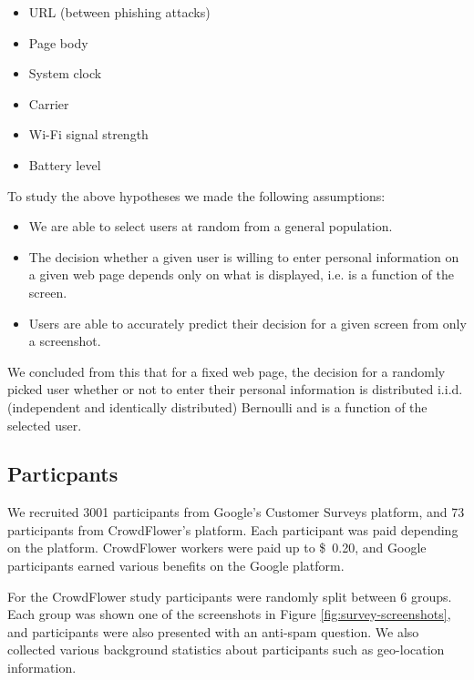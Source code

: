 \documentclass[twoside,letterpaper]{soups}
\begin{document}
\begin{itemize}
\item URL (between phishing attacks)
\item Page body
\item System clock %
\item Carrier
\item Wi-Fi signal strength
\item Battery level
\end{itemize}

To study the above hypotheses we made the following assumptions:

\begin{itemize}
\item We are able to select users at random from a general population.
\item The decision whether a given user is willing to enter personal information on a given web page depends only on what is displayed, i.e. is a function of the screen.
\item Users are able to accurately predict their decision for a given screen from only a screenshot.
\end{itemize}

We concluded from this that for a fixed web page, the decision for a randomly picked user whether or not to enter their personal information is distributed i.i.d. (independent and identically distributed) Bernoulli and is a function of the selected user.

\subsection{Particpants}

We recruited 3001 participants from Google's Customer Surveys platform, and 73 participants from CrowdFlower's platform. Each participant was paid depending on the platform. CrowdFlower workers were paid up to \$~0.20, and Google participants earned various benefits on the Google platform. %

For the CrowdFlower study participants were randomly split between 6 groups. Each group was shown one of the screenshots in Figure \ref{fig:survey-screenshots}, and participants were also presented with an anti-spam question. We also collected various background statistics about participants such as geo-location information.
\end{document}
